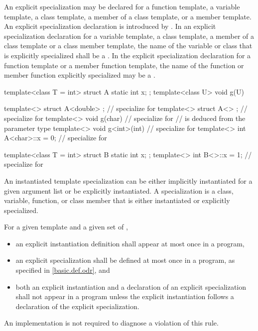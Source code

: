 \pnum
An explicit specialization may be declared for a function template,
a variable template, a class template, a member of a class template, or
a member template.
An explicit specialization declaration is introduced by
.
In an explicit specialization declaration for
a variable template, a class template,
a member of a class template or a class member template,
the name of the variable or class that is explicitly specialized shall be a
.
In the explicit specialization declaration for a function template or
a member function template,
the name of the function or member function explicitly specialized may be a
.
\begin{example}

\begin{codeblock}
template<class T = int> struct A {
  static int x;
};
template<class U> void g(U) { }

template<> struct A<double> { };        // specialize for 
template<> struct A<> { };              // specialize for 
template<> void g(char) { }             // specialize for 
                                        //  is deduced from the parameter type
template<> void g<int>(int) { }         // specialize for 
template<> int A<char>::x = 0;          // specialize for 

template<class T = int> struct B {
  static int x;
};
template<> int B<>::x = 1;              // specialize for 
\end{codeblock}
\end{example}

\pnum
An instantiated template specialization can be either implicitly
instantiated for a given argument list or be explicitly
instantiated.
A specialization is a class, variable, function, or class member that is either
instantiated or explicitly specialized.

\pnum
For a given template and a given set of
,
\begin{itemize}
\item
an explicit instantiation definition shall appear at most once in a program,
\item
an explicit specialization shall be defined at most once
in a program, as specified in \ref{basic.def.odr}, and
\item
both an explicit instantiation and a declaration of an
explicit specialization shall not appear in a program unless
the explicit instantiation follows a declaration of the explicit
specialization.
\end{itemize}
An implementation is not required to diagnose a violation of this rule.

